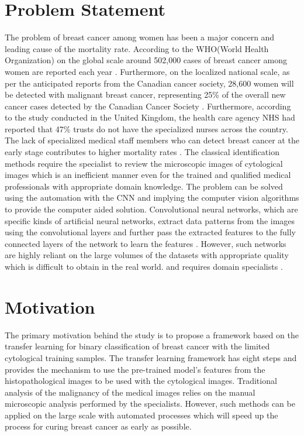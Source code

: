 \section{Problem Statement}
The problem of breast cancer among women has been a major concern and leading cause of the mortality rate.
According to the WHO(World Health Organization) on the global scale around 502,000 cases of breast cancer among women are reported each year \citep*{jelen2008classification}. 
Furthermore, on the localized national scale, as per the anticipated reports from the Canadian cancer society, 28,600 women will be detected 
with malignant breast cancer, representing 25\% of the overall new cancer cases detected by the Canadian Cancer Society \citet{CanadianCancerSociety}.
Furthermore, according to the study conducted in the United Kingdom, the health care agency NHS had reported that 47\% trusts do not have the 
specialized nurses across the country. The lack of specialized medical staff members who can detect breast cancer at the early stage contributes to higher mortality rates \citep{tan2017breast}. 
The classical identification methods require the specialist to review the microscopic images of cytological images which is an inefficient manner even for the trained and qualified medical professionals with appropriate domain knowledge.
The problem can be solved using the automation with the CNN and implying the computer vision algorithms to provide the computer aided solution. Convolutional neural networks, 
which are specific kinds of artificial neural networks, extract data patterns 
from the images using the convolutional layers and further pass the extracted features to the fully connected 
layers of the network to learn the features \citep{wani2020basics}. 
However, such networks are highly reliant on the large volumes of the datasets with appropriate quality which is difficult to obtain in the real world.
and requires domain specialists \citep{srivastava2014dropout}.


\section{Motivation}
The primary motivation behind the study is to propose a framework based on the transfer learning for binary classification of breast cancer with the limited cytological training samples. 
The transfer learning framework has eight steps and provides the mechanism to use the pre-trained model’s features from the histopathological
images to be used with the cytological images. Traditional analysis of the malignancy of the medical images relies on the manual microscopic analysis performed by the specialists. 
However, such methods can be applied on the large scale with automated processes which will speed up the process for curing breast cancer as early as possible. 

